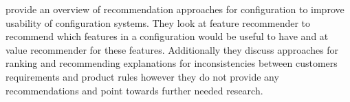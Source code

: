 \begin{description}[style=unboxed, leftmargin=0cm, font=\normalfont]
    \item[\citeauthor{falknerRecommendationTechnologiesConfigurable2011} \cite{falknerRecommendationTechnologiesConfigurable2011}] provide an overview of recommendation approaches for configuration to improve usability of configuration systems. They look at feature recommender to recommend which features in a configuration would be useful to have and at value recommender for these features. Additionally they discuss approaches for ranking and recommending explanations for inconsistencies between customers requirements and product rules however they do not provide any recommendations and point towards further needed research.
\end{description}

